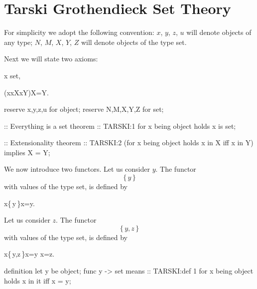 \section{Tarski Grothendieck Set Theory}

\begin{paracol}{2}
For simplicity we adopt the following convention: $x$, $y$,
$z$, $u$ will denote objects of any type; $N$, $M$, $X$, $Y$, $Z$
will denote objects of the type set.
  
Next we will state two axioms:
\begin{theorem}
x \is \textrm{set},
\end{theorem}
\begin{theorem}
(\forall x\holds x\in X\iff x\in Y)\implies X=Y.
\end{theorem}

\switchcolumn

\begin{mizar}
 reserve x,y,z,u for object;
 reserve N,M,X,Y,Z for set;

:: Everything is a set
theorem :: TARSKI:1
  for x being object holds x is set;

:: Extensionality
theorem :: TARSKI:2 
  (for x being object
   holds x in X iff x in Y)
  implies X = Y;
\end{mizar}

\switchcolumn*\ensurevspace{5cm}

We now introduce two functors. Let us consider $y$. The functor
\[ \{\,y\,\} \]
with values of the type set, is defined by
\begin{definition}
x\in\{\,y\,\}\iff x=y.
\end{definition}
Let us consider $z$. The functor
\[ \{\,y,z\,\} \]
with values of the type set, is defined by
\begin{definition}
x\in\{\,y,z\,\}\iff x=y \lor x=z.
\end{definition}

\switchcolumn

\begin{mizar}
definition
  let y be object;
  func { y } -> set means
:: TARSKI:def 1
    for x being object
    holds x in it iff x = y;


\end{mizar}
\end{paracol}
